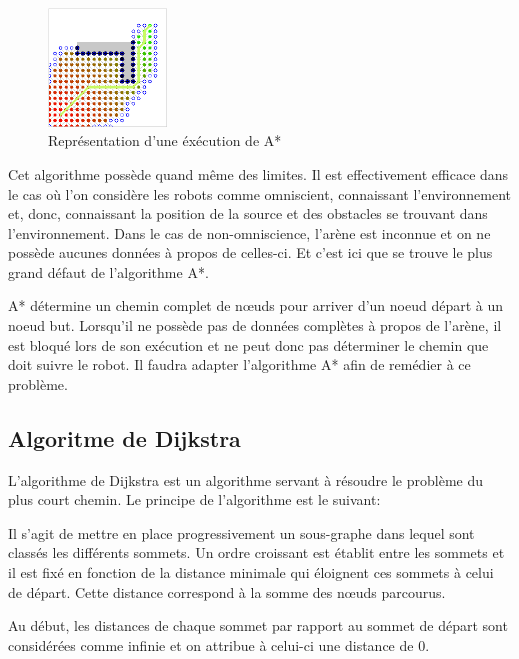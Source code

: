 \begin{figure}
  \vspace{-20pt}
  \begin{center}
    \includegraphics[width=0.28\textwidth]{aStar.png}
  \end{center}
  \caption{Représentation d'une éxécution de A*\cite{wikiA*}}
\end{figure}
Cet algorithme possède quand même des limites. Il est effectivement efficace dans le cas où l'on considère les robots comme omniscient, connaissant l'environnement et, donc, connaissant la position de la source et des obstacles se trouvant dans l'environnement. Dans le cas de non-omniscience, l'arène est inconnue et on ne possède aucunes données à propos de celles-ci. Et c'est ici que se trouve le plus grand défaut de l'algorithme A*.

A* détermine un chemin complet de nœuds pour arriver d'un noeud départ à un noeud but. Lorsqu'il ne possède pas de données complètes à propos de l'arène, il est bloqué lors de son exécution et ne peut donc pas déterminer le chemin que doit suivre le robot. Il faudra adapter l'algorithme A* afin de remédier à ce problème.

\subsection{Algoritme de Dijkstra \cite{wikiDijkstra}}

L’algorithme de Dijkstra est un algorithme servant à résoudre le problème du plus court chemin. Le principe de l'algorithme est le suivant:

Il s'agit de mettre en place progressivement un sous-graphe dans lequel sont classés les différents sommets. Un ordre croissant est établit entre les sommets et il est fixé en fonction de la distance minimale qui éloignent ces sommets à celui de départ. Cette distance correspond à la somme des nœuds parcourus.

Au début, les distances de chaque sommet par rapport au sommet de départ sont considérées comme infinie et on attribue à celui-ci une distance de 0.

